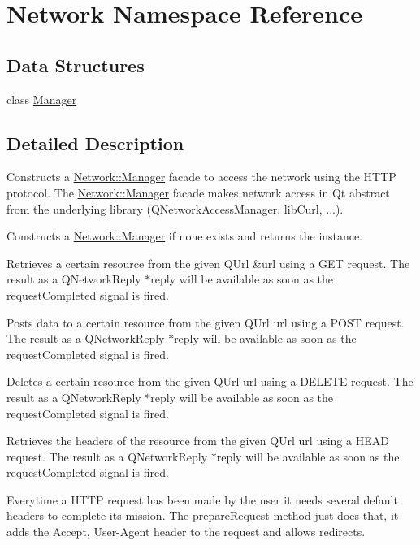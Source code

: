 \hypertarget{namespaceNetwork}{}\section{Network Namespace Reference}
\label{namespaceNetwork}
\subsection*{Data Structures}
\begin{DoxyCompactItemize}
\item 
class \mbox{\hyperlink{classNetwork_1_1Manager}{Manager}}
\end{DoxyCompactItemize}


\subsection{Detailed Description}
Constructs a \mbox{\hyperlink{classNetwork_1_1Manager}{Network\+::\+Manager}} facade to access the network using the H\+T\+TP protocol. The \mbox{\hyperlink{classNetwork_1_1Manager}{Network\+::\+Manager}} facade makes network access in Qt abstract from the underlying library (Q\+Network\+Access\+Manager, lib\+Curl, ...).

Constructs a \mbox{\hyperlink{classNetwork_1_1Manager}{Network\+::\+Manager}} if none exists and returns the instance.

Retrieves a certain resource from the given Q\+Url \&url using a G\+ET request. The result as a Q\+Network\+Reply $\ast$reply will be available as soon as the request\+Completed signal is fired.

Posts data to a certain resource from the given Q\+Url url using a P\+O\+ST request. The result as a Q\+Network\+Reply $\ast$reply will be available as soon as the request\+Completed signal is fired.

Deletes a certain resource from the given Q\+Url url using a D\+E\+L\+E\+TE request. The result as a Q\+Network\+Reply $\ast$reply will be available as soon as the request\+Completed signal is fired.

Retrieves the headers of the resource from the given Q\+Url url using a H\+E\+AD request. The result as a Q\+Network\+Reply $\ast$reply will be available as soon as the request\+Completed signal is fired.

Everytime a H\+T\+TP request has been made by the user it needs several default headers to complete it\textquotesingle{}s mission. The prepare\+Request method just does that, it adds the Accept, User-\/\+Agent header to the request and allows redirects.

